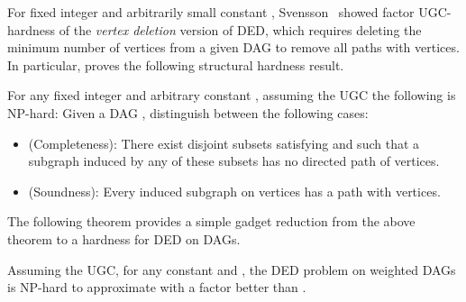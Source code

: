 \documentclass[oribibl]{llncs}
\newcommand{\mink}{{\sc DED}\xspace}
\begin{document}
For fixed integer  and arbitrarily small constant ,
Svensson~\cite{svensson2012hardness} showed factor 
UGC-hardness of
the \emph{vertex deletion} version of \mink, which requires deleting
the minimum number of vertices from a given DAG to remove all paths
with  vertices. 
In particular, 
\cite{svensson2012hardness} proves
the following structural hardness result.
\begin{theorem}
	\label{thm:svensson} For any fixed integer  and arbitrary
	constant , assuming the UGC the following is NP-hard: 
	Given a DAG
	, distinguish between the following cases:
	\begin{itemize} 
		\item \textnormal{(Completeness):} 
			There exist  disjoint subsets
			 satisfying  and such that a
			subgraph induced by any  of these subsets
			has no directed path of  vertices.  
		\item \textnormal{(Soundness):} 
			Every induced subgraph on 
			vertices has a path with  vertices.  
	\end{itemize}
\end{theorem}
The following theorem provides a simple gadget reduction from the
above theorem to a hardness for \mink on DAGs.
\begin{theorem}
  \label{thm:ded-hardness}
  Assuming the UGC, for any constant 
  and , 
  the \mink problem on weighted DAGs is NP-hard to approximate with a
  factor better than .
\end{theorem}
\end{document}
